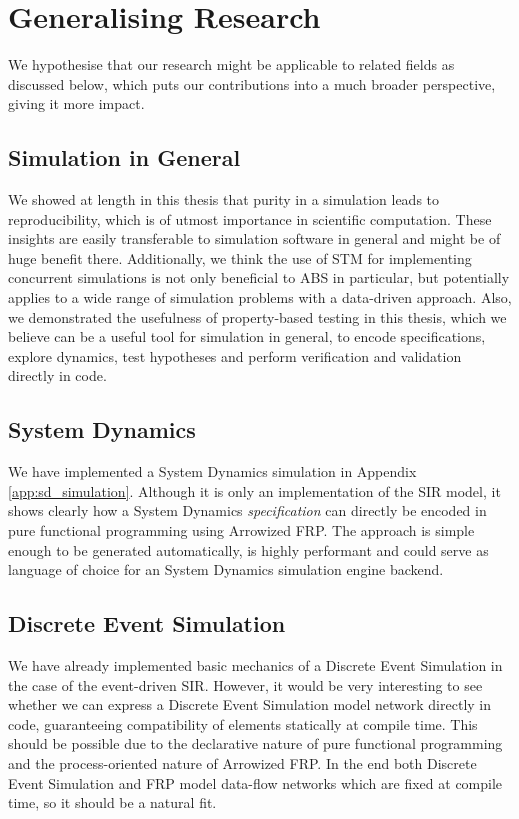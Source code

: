 \section{Generalising Research}
We hypothesise that our research might be applicable to related fields as discussed below, which puts our contributions into a much broader perspective, giving it more impact.

\subsection{Simulation in General}
We showed at length in this thesis that purity in a simulation leads to reproducibility, which is of utmost importance in scientific computation. These insights are easily transferable to simulation software in general and might be of huge benefit there.
Additionally, we think the use of STM for implementing concurrent simulations is not only beneficial to ABS in particular, but potentially applies to a wide range of simulation problems with a data-driven approach. Also, we demonstrated the usefulness of property-based testing in this thesis, which we believe can be a useful tool for simulation in general, to encode specifications, explore dynamics, test hypotheses and perform verification and validation directly in code.

\subsection{System Dynamics}
We have implemented a System Dynamics simulation in Appendix \ref{app:sd_simulation}. Although it is only an implementation of the SIR model, it shows clearly how a System Dynamics \textit{specification} can directly be encoded in pure functional programming using Arrowized FRP. The approach is simple enough to be generated automatically, is highly performant and could serve as language of choice for an System Dynamics simulation engine backend.

\subsection{Discrete Event Simulation}
We have already implemented basic mechanics of a Discrete Event Simulation in the case of the event-driven SIR. However, it would be very interesting to see whether we can express a Discrete Event Simulation model network directly in code, guaranteeing compatibility of elements statically at compile time. This should be possible due to the declarative nature of pure functional programming and the process-oriented nature of Arrowized FRP. In the end both Discrete Event Simulation and FRP model data-flow networks which are fixed at compile time, so it should be a natural fit.

